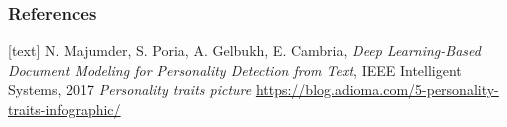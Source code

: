 \documentclass{beamer}
\begin{document}
	\begin{frame}
		\frametitle{References}
		\begin{thebibliography}{9}
			[text]
			N. Majumder, S. Poria, A. Gelbukh, E. Cambria,
			\textit{Deep Learning-Based
				Document Modeling
				for Personality
				Detection from Text},
			IEEE Intelligent Systems,
			2017
			\textit{Personality traits picture}
			\url{https://blog.adioma.com/5-personality-traits-infographic/}
		\end{thebibliography}
	\end{frame}
	
\end{document}
